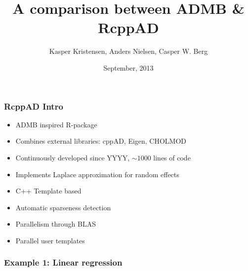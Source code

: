 \documentclass[compress]{beamer}
\title[RcppAD]
{A comparison between ADMB \& RcppAD}
\author[K. Kristensen, A. Nielsen, C.W. Berg ]%
{Kasper Kristensen, Anders Nielsen, Casper W. Berg}
\date[September 2013] %
{September, 2013}
\begin{document}
\begin{frame}[plain]
  \titlepage
\end{frame}

\begin{frame}
\frametitle{RcppAD Intro}

\begin{itemize}
  \item ADMB inspired R-package
  \item Combines external libraries: cppAD, Eigen, CHOLMOD
  \item Continuously developed since YYYY, $\sim 1000$ lines of code
  \item Implements Laplace approximation for random effects
  \item C++ Template based
  \item Automatic sparseness detection
  \item Parallelism through BLAS
  \item Parallel user templates
\end{itemize}


\end{frame}

\begin{frame}
  \frametitle{Example 1: Linear regression}
\end{frame}
\end{document}
